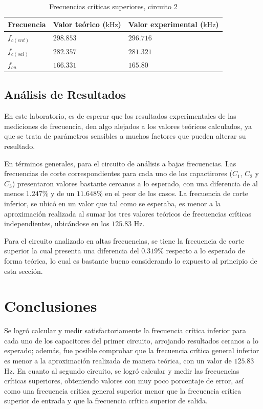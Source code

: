 \documentclass[journal]{IEEEtran}
\begin{document}
\begin{table}[H]
        \centering
        \renewcommand{\arraystretch}{1.5}
        \caption{Frecuencias críticas superiores, circuito 2}
        \begin{tabular}{ >{\centering\arraybackslash}m{2.5cm} >{\centering\arraybackslash}m{2.5cm} >{\centering\arraybackslash}m{2.5cm} }
                \hline
            Frecuencia & Valor teórico ($\mathrm{kHz}$) & Valor experimental ($\mathrm{kHz}$)\\ 
            \hline
            \centering
            $f_{c(ent)}$ & $298.853$  & $296.716$  \\
            $f_{c(sal)}$ & $282.357$  & $281.321$  \\
            $f_{cu}$ & $166.331$  & $165.80$  \\ 
            \hline
        \end{tabular}
        \label{tabla7}
    \end{table}   

\subsection{Análisis de Resultados}
En este laboratorio, es de esperar que los resultados experimentales de las mediciones de frecuencia, den algo alejados
a los valores teóricos calculados, ya que se trata de parámetros sensibles a muchos factores que pueden alterar
su resultado. 

En términos generales, para el circuito de análisis a bajas frecuencias. Las frecuencias de corte correspondientes para cada uno
de los capactirores ($C_1$, $C_2$ y $C_3$) presentaron valores bastante cercanos a lo esperado, con una diferencia de al menos $1.247\%$ 
y de un $11.648\%$ en el peor de los casos. La frecuencia de corte inferior, se ubicó en un valor que tal como se esperaba, es menor 
a la aproximación realizada al sumar los tres valores teóricos de frecuencias críticas independientes, ubicándose en los $125.83$ $\mathrm{Hz}$. 

Para el circuito analizado en altas frecuencias, se tiene la frecuencia de corte superior la cual presenta una diferencia del $0.319\%$ 
respecto a lo esperado de forma teórica, lo cual es bastante bueno considerando lo expuesto al principio de esta sección. 


\section{Conclusiones}
Se logró calcular y medir satisfactoriamente la frecuencia crítica inferior para cada uno de los capacitores del primer circuito, 
arrojando resultados ceranos a lo esperado; además, fue posible comprobar que la frecuencia crítica general inferior es menor a la 
aproximación realizada de manera teórica, con un valor de $125.83$ $\mathrm{Hz}$.
En cuanto al segundo circuito, se logró calcular y medir las frecuencias críticas superiores, obteniendo valores con muy poco porcentaje de error, así como una frecuencia crítica general superior menor que la frecuencia crítica superior de entrada y que la frecuencia crítica superior de salida.
\appendices
\end{document}
